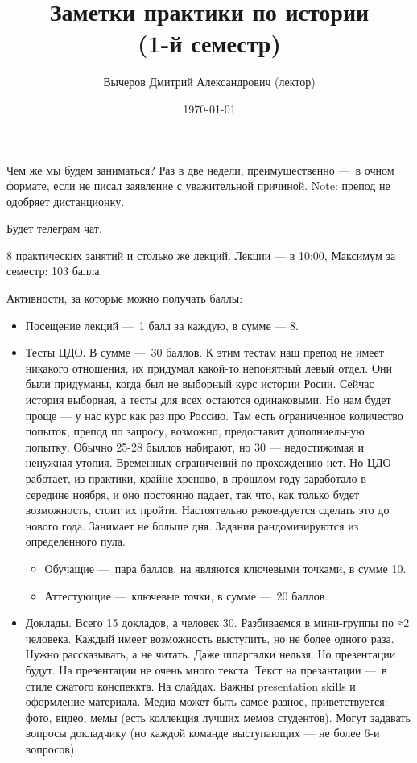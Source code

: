\documentclass[12pt, a4paper]{article}
\title{Заметки практики по истории \\(1-й семестр)}
\author{
  \vova
  \and
  {Вычеров Дмитрий Александрович (лектор)}
}
\date{\today}
\begin{document}
  \tittoc

    Чем же мы будем заниматься?
    Раз в две недели, преимущественно — в очном формате, если не писал заявление с уважительной причиной.
    Note: препод не одобряет дистанционку.

    Будет телеграм чат.

    8 практических занятий и столько же лекций.
    Лекции — в 10:00, 
    Максимум за семестр: 103 балла.

    Активности, за которые можно получать баллы:

    \begin{itemize}
        \item Посещение лекций — 1 балл за каждую, в сумме — 8.
        \item Тесты ЦДО. В сумме — 30 баллов. К этим тестам наш препод не имеет никакого отношения, их придумал какой-то непонятный левый отдел.
        Они были придуманы, когда был не выборный курс истории Росии. Сейчас история выборная, а тесты для всех остаются одинаковыми. Но нам будет проще — у нас курс как раз про Россию.
        Там есть ограниченное количество попыток, препод по запросу, возможно, предоставит дополниельную попытку. Обычно 25-28 быллов набирают, но 30 — недостижимая и ненужная утопия. Временных ограничений по прохождению нет. 
        Но ЦДО работает, из практики, крайне хреново, в прошлом году заработало в середине ноября, и оно постоянно падает, 
        так что, как только будет возможность, стоит их пройти. Настоятельно рекоендуется сделать это до нового года. Занимает не больше дня.
        Задания рандомизируются из определённого пула.
        \begin{itemize}
            \item Обучащие — пара баллов, на являются ключевыми точками, в сумме 10.
            \item Аттестующие — ключевые точки, в сумме — 20 баллов.
        \end{itemize}
        \item Доклады. Всего 15 докладов, а человек 30. 
        Разбиваемся в мини-группы по ≈2 человека. Каждый имеет возможность выступить, но не более одного раза.
        Нужно рассказывать, а не читать. Даже шпаргалки нельзя. Но презентации будут. На презентации не очень много текста.
        Текст на презантации — в стиле сжатого конспеккта. На слайдах. Важны presentation skills и оформление материала.
        Медиа может быть самое разное, приветствуется: фото, видео, мемы (есть коллекция лучших мемов студентов). 
        Могут задавать вопросы докладчику (но каждой команде выступающих — не более 6-и вопросов).

\end{itemize}
\end{document}
